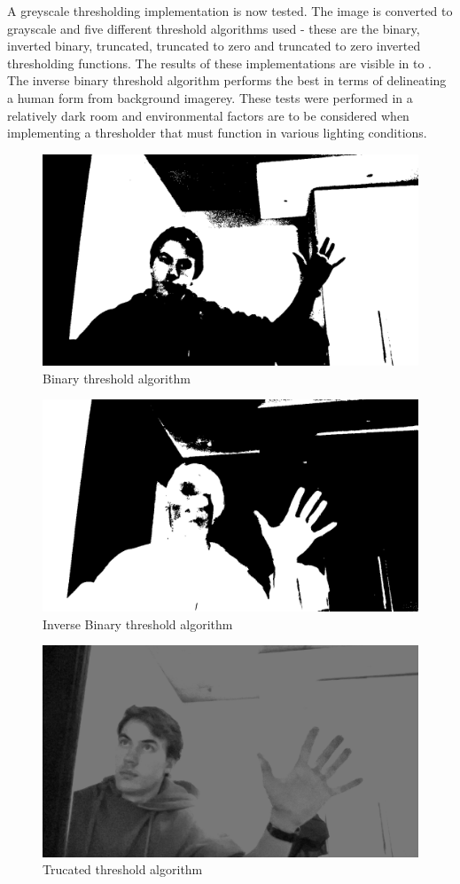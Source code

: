 A greyscale thresholding implementation is now tested. The image is converted to grayscale and five different threshold algorithms used - these are the binary, inverted binary, truncated, truncated to zero and truncated to zero inverted thresholding functions. The results of these implementations are visible in  to . The inverse binary threshold algorithm performs the best in terms of delineating a human form from background imagerey. These tests were performed in a relatively dark room and environmental factors are to be considered when implementing a thresholder that must function in various lighting conditions.

\begin{figure}[h]
    \centering
    \includegraphics[width=0.4\linewidth]{figures/threshold_binary.png}
    \caption{Binary threshold algorithm}
    \label{fig:threshold_binary}
\end{figure}

\begin{figure}[h]
    \centering
    \includegraphics[width=0.4\linewidth]{figures/threshold_binary_inverse.png}
    \caption{Inverse Binary threshold algorithm}
    \label{fig:threshold_binary_inverse}
\end{figure}

\begin{figure}[h]
    \centering
    \includegraphics[width=0.4\linewidth]{figures/threshold_truncated.png}
    \caption{Trucated threshold algorithm}
    \label{fig:threshold_truncated}
\end{figure}

